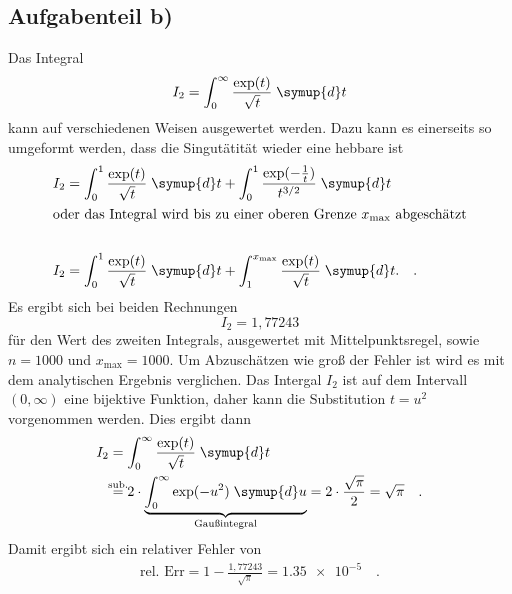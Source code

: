 \subsection*{Aufgabenteil b)}
Das Integral
\begin{equation*}
  I_2=\int_{0}^\infty \frac{\exp(t)}{\sqrt{t}} \;\symup{d}t
\end{equation*}
kann auf verschiedenen Weisen ausgewertet werden.
Dazu kann es einerseits so umgeformt werden, dass die Singutätität wieder eine hebbare ist
\begin{align*}
  I_2 &= \int_{0}^1 \frac{\exp(t)}{\sqrt{t}} \;\symup{d}t + \int_{0}^1 \frac{\exp(-\frac{1}{t})}{t^{3/2}} \;\symup{d}t \\
  \intertext{oder das Integral wird bis zu einer oberen Grenze $x_\text{max}$ abgeschätzt}\\
  I_2 &= \int_{0}^1 \frac{\exp(t)}{\sqrt{t}} \;\symup{d}t + \int_{1}^{x_{\text{max}}} \frac{\exp(t)}{\sqrt{t}} \;\symup{d}t. \quad.
\end{align*}
Es ergibt sich bei beiden Rechnungen
\begin{equation*}
  I_2 = 1,77243
\end{equation*}
für den Wert des zweiten Integrals, ausgewertet mit Mittelpunktsregel, sowie $n=1000$ und $x_{\text{max}}=1000$. Um Abzuschätzen wie groß der Fehler ist wird es mit dem analytischen Ergebnis verglichen.
Das Intergal $I_2$ ist auf dem Intervall $(0,\infty)$ eine bijektive Funktion, daher kann die Substitution $t=u^2$ vorgenommen werden.
Dies ergibt dann
\begin{align*}
  I_2 &=\int_{0}^\infty \frac{\exp(t)}{\sqrt{t}} \;\symup{d}t \\
  &\overset{\mathclap{\text{sub.}}}{=}2\cdot \underbrace{\int_{0}^\infty \exp(-u^2) \;\symup{d}u}_{\mathclap{\text{Gaußintegral}}} = 2\cdot\frac{\sqrt{\pi}}{2}=\sqrt{\pi} \quad.
\end{align*}
Damit ergibt sich ein relativer Fehler von
\begin{align*}
  \text{rel. Err} = 1-\frac{1,77243}{\sqrt{\pi}} = \num{1.35e-5}\quad.
\end{align*}

